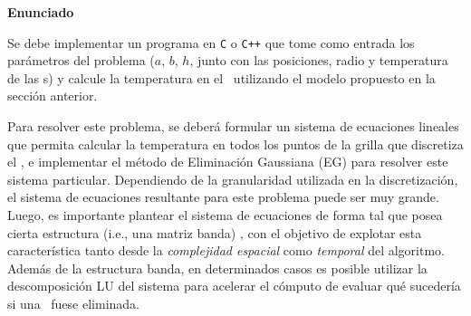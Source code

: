 {\noindent \bf Enunciado}

Se debe implementar un programa en \verb+C+ o \verb-C++- que tome como entrada los par\'ametros del problema ($a$, $b$, $h$, junto con las posiciones, radio y temperatura de las \atacante s) y calcule la temperatura en el \objeto\ utilizando el modelo propuesto en la secci\'on anterior.

Para resolver este problema, se deber\'a formular un sistema de ecuaciones lineales 
que permita calcular la temperatura en todos los puntos de la grilla que discretiza el \objeto, e
implementar el m\'etodo de Eliminaci\'on Gaussiana (EG) para resolver este sistema particular. Dependiendo de
la granularidad utilizada en la discretizaci\'on, el sistema de ecuaciones resultante para este problema puede ser 
muy grande. Luego, es importante plantear el sistema de ecuaciones de forma tal que posea cierta estructura (i.e., una matriz banda)
, con el objetivo de explotar esta caracter\'istica tanto desde la \emph{complejidad espacial} como \emph{temporal} del algoritmo. Adem\'as de
la estructura banda, en determinados casos es posible utilizar la descomposici\'on LU del sistema para acelerar el c\'omputo de evaluar qu\'e 
suceder\'ia si una \atacante\ fuese eliminada.

